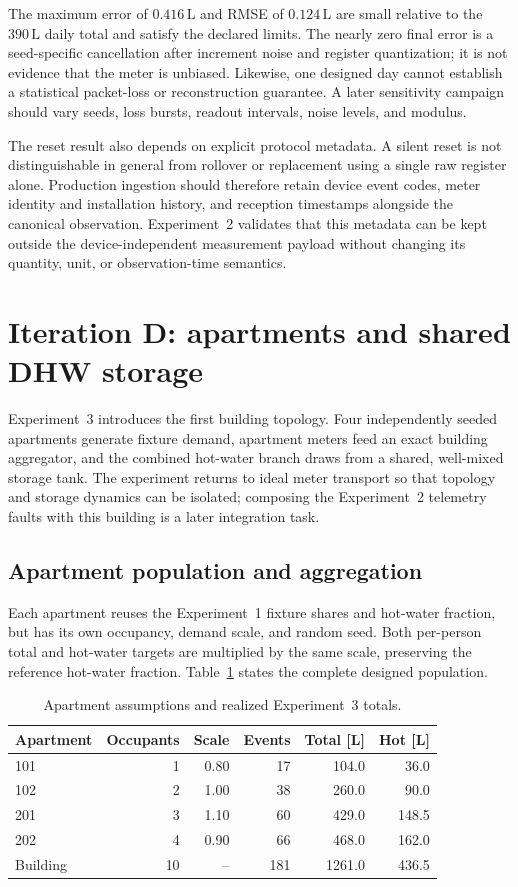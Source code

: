 \documentclass[11pt,a4paper]{article}
\begin{document}
The maximum error of $0.416\,\mathrm{L}$ and RMSE of $0.124\,\mathrm{L}$ are
small relative to the $390\,\mathrm{L}$ daily total and satisfy the declared
limits. The nearly zero final error is a seed-specific cancellation after
increment noise and register quantization; it is not evidence that the meter is
unbiased. Likewise, one designed day cannot establish a statistical packet-loss
or reconstruction guarantee. A later sensitivity campaign should vary seeds,
loss bursts, readout intervals, noise levels, and modulus.

The reset result also depends on explicit protocol metadata. A silent reset is
not distinguishable in general from rollover or replacement using a single raw
register alone. Production ingestion should therefore retain device event
codes, meter identity and installation history, and reception timestamps
alongside the canonical observation. Experiment~2 validates that this metadata
can be kept outside the device-independent measurement payload without changing
its quantity, unit, or observation-time semantics.

\section{Iteration D: apartments and shared DHW storage}
Experiment~3 introduces the first building topology. Four independently seeded
apartments generate fixture demand, apartment meters feed an exact building
aggregator, and the combined hot-water branch draws from a shared, well-mixed
storage tank. The experiment returns to ideal meter transport so that topology
and storage dynamics can be isolated; composing the Experiment~2 telemetry
faults with this building is a later integration task.

\subsection{Apartment population and aggregation}
Each apartment reuses the Experiment~1 fixture shares and hot-water fraction,
but has its own occupancy, demand scale, and random seed. Both per-person total
and hot-water targets are multiplied by the same scale, preserving the
reference hot-water fraction. Table~\ref{tab:experiment3-apartments} states the
complete designed population.

\begin{table}[htbp]
  \centering
  \caption{Apartment assumptions and realized Experiment~3 totals.}
  \label{tab:experiment3-apartments}
  \begin{tabular}{lrrrrr}
    \toprule
    Apartment & Occupants & Scale & Events & Total [L] & Hot [L] \\
    \midrule
    101 & 1 & 0.80 & 17 & 104.0 & 36.0 \\
    102 & 2 & 1.00 & 38 & 260.0 & 90.0 \\
    201 & 3 & 1.10 & 60 & 429.0 & 148.5 \\
    202 & 4 & 0.90 & 66 & 468.0 & 162.0 \\
    \midrule
    Building & 10 & -- & 181 & 1261.0 & 436.5 \\
    \bottomrule
  \end{tabular}
\end{table}
\end{document}
